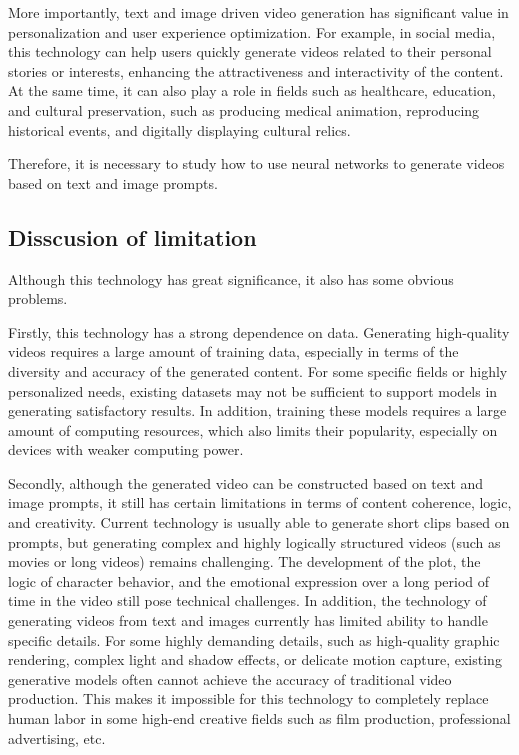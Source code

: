 More importantly, text and image driven video generation has significant value in personalization and user experience optimization. For example, in social media, this technology can help users quickly generate videos related to their personal stories or interests, enhancing the attractiveness and interactivity of the content. At the same time, it can also play a role in fields such as healthcare, education, and cultural preservation, such as producing medical animation, reproducing historical events, and digitally displaying cultural relics.

Therefore, it is necessary to study how to use neural networks to generate videos based on text and image prompts.

\subsection{Disscusion of limitation}
Although this technology has great significance, it also has some obvious problems.

Firstly, this technology has a strong dependence on data. Generating high-quality videos requires a large amount of training data, especially in terms of the diversity and accuracy of the generated content. For some specific fields or highly personalized needs, existing datasets may not be sufficient to support models in generating satisfactory results. In addition, training these models requires a large amount of computing resources, which also limits their popularity, especially on devices with weaker computing power.

Secondly, although the generated video can be constructed based on text and image prompts, it still has certain limitations in terms of content coherence, logic, and creativity. Current technology is usually able to generate short clips based on prompts, but generating complex and highly logically structured videos (such as movies or long videos) remains challenging. The development of the plot, the logic of character behavior, and the emotional expression over a long period of time in the video still pose technical challenges. In addition, the technology of generating videos from text and images currently has limited ability to handle specific details. For some highly demanding details, such as high-quality graphic rendering, complex light and shadow effects, or delicate motion capture, existing generative models often cannot achieve the accuracy of traditional video production. This makes it impossible for this technology to completely replace human labor in some high-end creative fields such as film production, professional advertising, etc.

